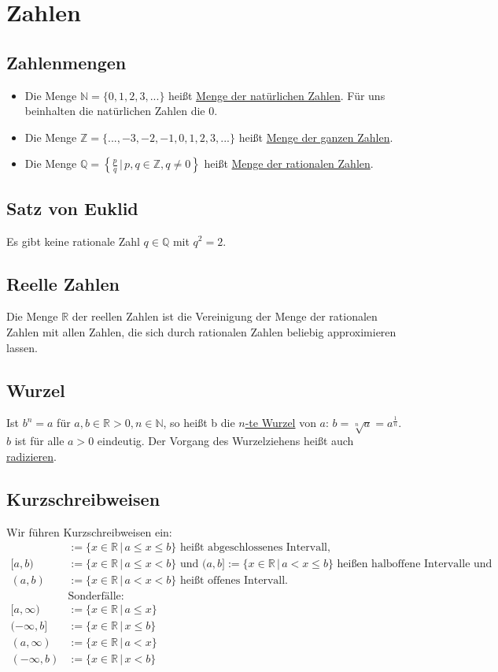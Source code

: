 \section{Zahlen}
\subsection{Zahlenmengen}
\begin{itemize}
\item{Die Menge $\mathbb{N} = \{0,1,2,3,...\}$ heißt \underline{Menge der natürlichen Zahlen}. Für uns beinhalten die natürlichen Zahlen die $0$.}
\item{Die Menge $\mathbb{Z} = \{...,-3,-2,-1,0,1,2,3,...\}$ heißt \underline{Menge der ganzen Zahlen}.}
\item{Die Menge $\mathbb{Q} = \left\{\frac{p}{q}\,|\,p,q \in \mathbb{Z}, q \neq 0\right\}$ heißt \underline{Menge der rationalen Zahlen}.}
\end{itemize}

\subsection{Satz von Euklid}
Es gibt keine rationale Zahl $q \in \mathbb{Q}$ mit $q^2 = 2$.

\subsection{Reelle Zahlen}
Die Menge $\mathbb{R}$ der reellen Zahlen ist die Vereinigung der Menge der rationalen Zahlen mit allen Zahlen, die sich durch rationalen Zahlen beliebig approximieren lassen.

\subsection{Wurzel}
Ist $b^n = a$ für $a, b \in \mathbb{R} > 0, n \in \mathbb{N}$, so heißt b die \underline{$n$-te Wurzel} von $a$: $b = \sqrt[n]{a}=a^\frac{1}{n}$. $b$ ist für alle $a > 0$ eindeutig. Der Vorgang des Wurzelziehens heißt auch \underline{radizieren}.

\subsection{Kurzschreibweisen}
Wir führen Kurzschreibweisen ein:
\begin{align*}
[a,b] &:= \{x\in\mathbb{R}\,|\,a \leq x \leq b\}\text{ heißt abgeschlossenes Intervall,} \\
[a,b) &:= \{x\in\mathbb{R}\,|\,a \leq x < b\}\text{ und }(a,b] := \{x\in\mathbb{R}\,|\,a < x \leq b\}\text{ heißen halboffene Intervalle und} \\
(a,b) &:= \{x\in\mathbb{R}\,|\,a < x < b\}\text{ heißt offenes Intervall.} \\
&\text{Sonderfälle:} \\
[a, \infty) &:= \{x\in\mathbb{R}\,|\,a \leq x\} \\
(-\infty, b] &:= \{x\in\mathbb{R}\,|\,x \leq b\} \\
(a, \infty) &:= \{x\in\mathbb{R}\,|\,a < x\} \\
(-\infty, b) &:= \{x\in\mathbb{R}\,|\,x < b\}
\end{align*}

